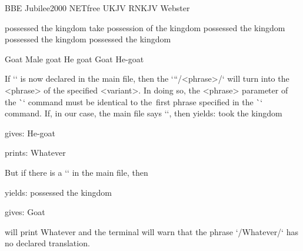 {\begtt \typosize[8.5/11]
 {BBE} {Jubilee2000} {NETfree} {UKJV} {RNKJV} {Webster} 

      {possessed the kingdom} %
      {take possession of the kingdom} %
      {possessed the kingdom} %
      {possessed the kingdom} %
      {possessed the kingdom} %
      
      {Goat} %
      {Male goat} %
      {He goat} %
      {Goat} %
      {He-goat} %

\endtt

If `\def\tmark {<variant>}` is now declared in the main file,
then the `\x``/<phrase>/` will turn into the <phrase> of the specified <variant>.
In doing so, the <phrase> parameter of the \`\x` command must be identical to the~first phrase specified in the \`\vdef` command. If, in our case, the main file says `\def\tmark{BBE}`, then
\medskip
{} yields: took the kingdom 

 gives: He-goat

 prints: Whatever

\medskip

But if there is a `\def\tmark{Jubilee2000}` in the main file, then

\medskip
{} yields: possessed the kingdom 

 gives: Goat

  will print Whatever and the terminal will warn
                                  that the phrase `/Whatever/` has no declared translation.
\medskip




%

}
